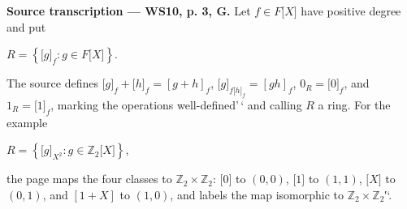 \textbf{Source transcription --- WS10, p. 3, G.} Let \(f \in F\lbrack X\rbrack\) have positive degree and put

\(R = \left\{ {\lbrack g\rbrack_{f}:g \in F\lbrack X\rbrack} \right\}.\)

The source defines \(\lbrack g\rbrack_{f} + \lbrack h\rbrack_{f} = \left\lbrack {g + h} \right\rbrack_{f}\), \(\lbrack g\rbrack_{{f{\lbrack h\rbrack}}_{f}} = \left\lbrack {gh} \right\rbrack_{f}\), \(0_{R} = \lbrack 0\rbrack_{f}\), and \(1_{R} = \lbrack 1\rbrack_{f}\), marking the operations well-defined'\,` and calling \(R\) a ring. For the example

\(R = \left\{ {\lbrack g\rbrack_{X^{2}}:g \in \mathbb{Z}_{2}\lbrack X\rbrack} \right\}\),

the page maps the four classes to \(\mathbb{Z}_{2} \times \mathbb{Z}_{2}\): \(\lbrack 0\rbrack\) to \(\left( {0,0} \right)\), \(\lbrack 1\rbrack\) to \(\left( {1,1} \right)\), \(\lbrack X\rbrack\) to \(\left( {0,1} \right)\), and \(\left\lbrack {1 + X} \right\rbrack\) to \(\left( {1,0} \right)\), and labels the map isomorphic to \(\mathbb{Z}_{2} \times \mathbb{Z}_{2}\)′`.
